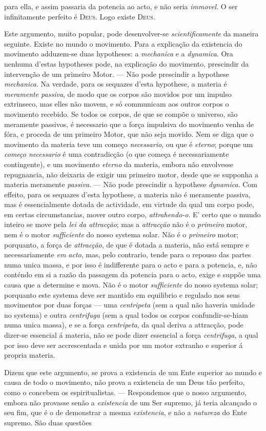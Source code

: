 para ella, e assim passaria da potencia ao acto, e não seria \emph{immovel}. O ser infinitamente perfeito é \textsc{Deus}. Logo existe \textsc{Deus}.\par Este argumento, muito popular, pode desenvolver-se \emph{scientificamente} da maneira seguinte. Existe no mundo o movimento. Para a explicação da existencia do movimento adduzem-se duas hypotheses: a \emph{mechanica} e a \emph{dynamica}. Ora nenhuma d'estas hypotheses pode, na explicação do movimento, prescindir da intervenção de um primeiro Motor. --- Não pode prescindir a hypothese \emph{mechanica}. Na verdade, para os sequazes d'esta hypothese, a materia é \emph{meramente passiva}, de modo que os corpos são movidos por um impulso extrinseco, mas elles não movem, e só communicam aos outros corpos o movimento recebido. Se todos os corpos, de que se compõe o universo, são meramente passivos, é necessario que a força impulsiva do movimento venha de fóra, e proceda de um primeiro Motor, que não seja movido. Nem se diga que o movimento da materia teve um começo \emph{necessario}, ou que é \emph{eterno}; porque um \emph{começo necessario} é uma contradicção (o que começa é necessariamente contingente), e um movimento \emph{eterno} da materia, embora não envolvesse repugnancia, não deixaria de exigir um primeiro motor, desde que se supponha a materia meramente \emph{passiva}. --- Não pode prescindir a hypothese \emph{dynamica}. Com effeito, para os sequazes d'esta hypothese, a materia não é meramente passiva, mas é essencialmente dotada de actividade, em virtude da qual um corpo pode, em certas circumstancias, mover outro corpo, \emph{attrahendo-o}. E' certo que o mundo inteiro se move pela \emph{lei da attracção}; mas a \emph{attracção} não é o \emph{primeiro} motor, nem é o motor \emph{sufficiente} do nosso systema solar. Não é o \emph{primeiro} motor; porquanto, a força de \emph{attracção}, de que é dotada a materia, não está sempre e necessariamente \emph{em acto}, mas, pelo contrario, tende para o repouso das partes numa unica massa, e por isso é indifferente para o acto e para a potencia, e, não conténdo em si a razão da passagem da potencia para o acto, exige e suppõe uma causa que a determine e mova. Não é o motor \emph{sufficiente} do nosso systema solar; porquanto este systema deve ser mantido em equilibrio e regulado nos seus movimentos por duas forças --- uma \emph{centripeta} (sem a qual não haveria unidade no systema) e outra \emph{centrifuga} (sem a qual todos os corpos confundir-se-hiam numa unica massa), e se a força \emph{centripeta}, da qual deriva a attracção, pode dizer-se essencial á materia, não se pode dizer essencial a força \emph{centrifuga}, a qual por isso deve ser accrescentada e unida por um motor extranho e superior á propria materia.\par Dizem que este argumento, se prova a existencia de um Ente superior ao mundo e causa de todo o movimento, não prova a existencia de um Deus tão perfeito, como o concebem os espiritualistas. --- Respondemos que o nosso argumento, embora não provasse senão a \emph{existencia} de um Ser supremo, já teria alcançado o seu fim, que é o de demonstrar a mesma \emph{existencia}, e não a \emph{natureza} do Ente supremo. São duas questões 